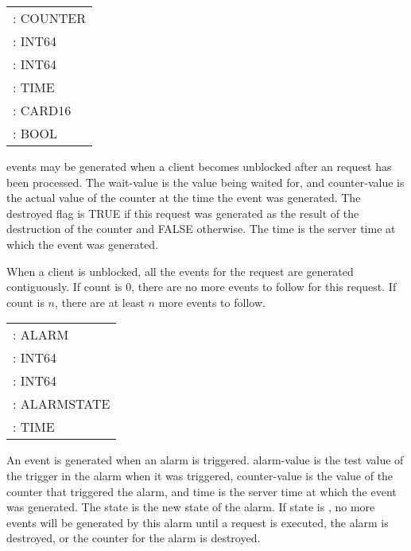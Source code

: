 \begin{description}


\begin{tabular}{l}
	\param{counter}: COUNTER \\
 	\param{wait-value}: INT64 \\
	\param{counter-value}: INT64 \\
 	\param{time}: TIME \\
	\param{count}: CARD16 \\
	\param{destroyed}: BOOL
\end{tabular}

 events may be generated when a client becomes unblocked
after an  request has been processed.
The wait-value is the value being waited for, and
counter-value is the actual value of the counter at the time
the event was generated. The
destroyed flag is TRUE if this request was generated as the
result of the destruction of the counter and FALSE otherwise.
The time is the server time at which the event was generated.

When a client is unblocked, all the  events for the
 request are generated contiguously. If
count is 0, there are no more events to follow for this request. If
count is $n$, there are at least $n$ more events to follow.


\begin{tabular}{l}
	\param{alarm}: ALARM \\
 	\param{counter-value}: INT64 \\
	\param{alarm-value}: INT64 \\
 	\param{state}: ALARMSTATE \\
 	\param{time}: TIME
\end{tabular}

An  event is generated when an alarm is triggered.
alarm-value is the test value of the trigger in the alarm when it was
triggered, counter-value is the value of the counter that triggered
the alarm, and time is the server time at which the event was
generated. The state is the new state of the alarm. If state is
, no more events will be generated by this alarm until a
 request is executed, the alarm is destroyed, or the
counter for the alarm is destroyed.

\end{description}

